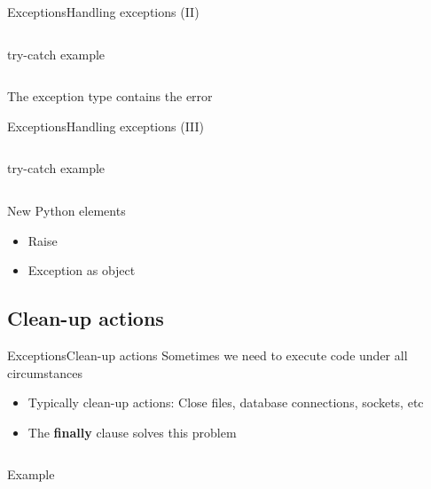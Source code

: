 \documentclass[10pt,compress]{beamer} %
\begin{document}
\begin{frame}{Exceptions}{Handling exceptions (II)}
    \begin{columns}
	\begin{exampleblock}{try-catch example}
	\vspace{-0.2cm}
		
	\vspace{-0.2cm}
	\end{exampleblock}
	\end{columns}
	\bigskip
	The exception type contains the error
\end{frame}

\begin{frame}{Exceptions}{Handling exceptions (III)}
	\vspace{-0.2cm}
    \begin{columns}
	\begin{exampleblock}{try-catch example}
	\vspace{-0.2cm}
		
	\vspace{-0.2cm}
	\end{exampleblock}
	\end{columns}
	\bigskip
	New Python elements
		\begin{itemize}
		\item Raise
        \item Exception as object
		\end{itemize}
\end{frame}

\subsection{Clean-up actions}
\begin{frame}{Exceptions}{Clean-up actions}
	\vspace{-0.2cm}
	Sometimes we need to execute code under all circumstances
	\begin{itemize}
		\item Typically clean-up actions: Close files, database connections, sockets, etc
		\item The \textbf{finally} clause solves this problem
	\end{itemize}

	\vspace{-0.2cm}
    \begin{columns}
	\begin{exampleblock}{Example}
	\vspace{-0.2cm}
		
	\vspace{-0.2cm}
	\end{exampleblock}

	\end{columns}
\end{frame}
\end{document}
